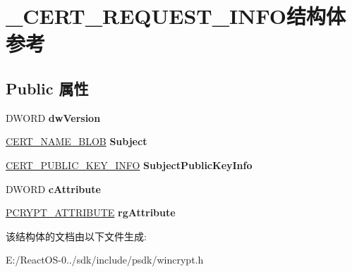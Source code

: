 \hypertarget{struct___c_e_r_t___r_e_q_u_e_s_t___i_n_f_o}{}\section{\+\_\+\+C\+E\+R\+T\+\_\+\+R\+E\+Q\+U\+E\+S\+T\+\_\+\+I\+N\+F\+O结构体 参考}
\label{struct___c_e_r_t___r_e_q_u_e_s_t___i_n_f_o}
\subsection*{Public 属性}
\begin{DoxyCompactItemize}
\item 
\mbox{\label{struct___c_e_r_t___r_e_q_u_e_s_t___i_n_f_o_ab627d3d214ddd88a671916f035406685}} 
D\+W\+O\+RD {\bfseries dw\+Version}
\item 
\mbox{\label{struct___c_e_r_t___r_e_q_u_e_s_t___i_n_f_o_ad659a2762cc39eda8064e8f4d5c4fec5}} 
\hyperlink{struct___c_r_y_p_t_o_a_p_i___b_l_o_b}{C\+E\+R\+T\+\_\+\+N\+A\+M\+E\+\_\+\+B\+L\+OB} {\bfseries Subject}
\item 
\mbox{\label{struct___c_e_r_t___r_e_q_u_e_s_t___i_n_f_o_a71857caad2a6cc0e88c381d5bb3e05c3}} 
\hyperlink{struct___c_e_r_t___p_u_b_l_i_c___k_e_y___i_n_f_o}{C\+E\+R\+T\+\_\+\+P\+U\+B\+L\+I\+C\+\_\+\+K\+E\+Y\+\_\+\+I\+N\+FO} {\bfseries Subject\+Public\+Key\+Info}
\item 
\mbox{\label{struct___c_e_r_t___r_e_q_u_e_s_t___i_n_f_o_a2ede0fce035fb11654d65a0ec1ea9dc5}} 
D\+W\+O\+RD {\bfseries c\+Attribute}
\item 
\mbox{\label{struct___c_e_r_t___r_e_q_u_e_s_t___i_n_f_o_a3651da3174f0170ef291f942a2c99ef2}} 
\hyperlink{struct___c_r_y_p_t___a_t_t_r_i_b_u_t_e}{P\+C\+R\+Y\+P\+T\+\_\+\+A\+T\+T\+R\+I\+B\+U\+TE} {\bfseries rg\+Attribute}
\end{DoxyCompactItemize}


该结构体的文档由以下文件生成\+:\begin{DoxyCompactItemize}
\item 
E\+:/\+React\+O\+S-\/0../sdk/include/psdk/wincrypt.\+h\end{DoxyCompactItemize}
